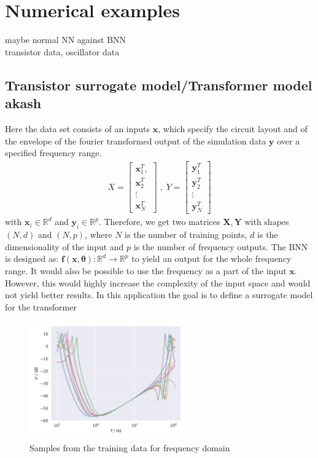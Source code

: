 \documentclass{article}
\begin{document}
\section{Numerical examples}
maybe normal NN against BNN\\
transistor data, oscillator data

\subsection{Transistor surrogate model/Transformer model akash}
Here the data set consists of an inputs $ \bm x$, which specify the circuit layout and of the envelope of the fourier transformed output of the simulation data $\bm y$ over a specified frequency range.
\begin{align}
    X = \begin{bmatrix}
        \bm x_1^T, \\
        \bm x_2^T\\
        \vdots\\
        \bm x_N^T
        \end{bmatrix} \;, \;
    Y = \begin{bmatrix}
        \bm y_1^T\\
        \bm y_2^T\\
        \vdots\\
        \bm y_N^T
    \end{bmatrix}
\end{align}
with $\bm x_i \in \mathbb{R}^d$ and $\bm y_i \in \mathbb{R}^{p}$. Therefore, we get two matrices $\bm X, \bm Y$ with shapes $(N, d)$ and $(N, p)$, where $N$ is the number of training points, $d$ is the dimensionality of the input and $p$ is the number of frequency outputs. The BNN is designed as: $\bm f(\bm x, \bm \theta): \mathbb{R}^d \rightarrow \mathbb{R}^p$ to yield an output for the whole frequency range. It would also be possible to use the frequency as a part of the input $\bm x$. However, this would highly increase the complexity of the input space and would not yield better results. In this application the goal is to define a surrogate model for the transformer
\begin{figure}[h]
    \centering
    \includegraphics[width=0.6\textwidth]{plots/data_samples.png}
    \caption{Samples from the training data for frequency domain}
    \label{fig:training_samples}
\end{figure}
\end{document}
